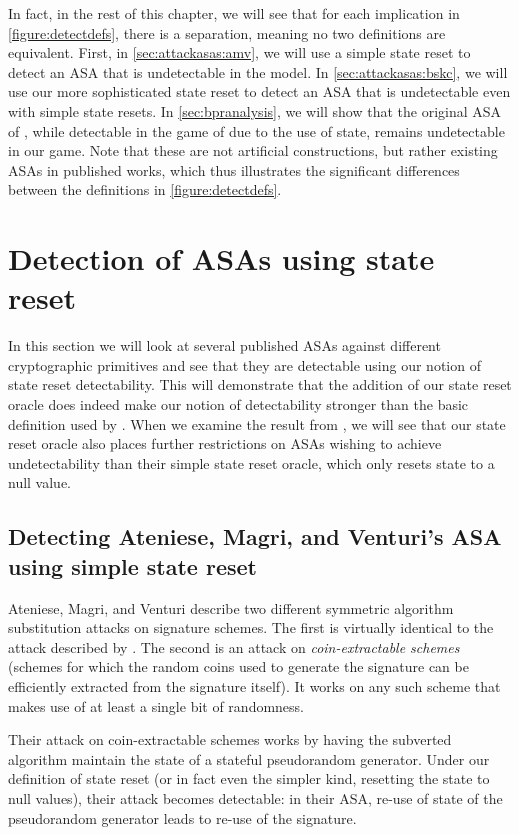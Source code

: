 In fact, in the rest of this chapter, we will see that for each implication in  \autoref{figure:detectdefs}, there is a separation, meaning no two definitions are equivalent. First, in \autoref{sec:attackasas:amv}, we will use a simple state reset to detect an ASA that is undetectable in the \cite{C:BelPatRog14} model. In \autoref{sec:attackasas:bskc}, we will use our more sophisticated state reset to detect an ASA that is undetectable even with simple state resets. In \autoref{sec:bpranalysis}, we will show that the original ASA of \cite{C:BelPatRog14}, while detectable in the game of \cite{CCS:BelJaeKan15} due to the use of state, remains undetectable in our game. Note that these are not artificial constructions, but rather existing ASAs in published works, which thus illustrates the significant differences between the definitions in \autoref{figure:detectdefs}.


\section{Detection of ASAs using state reset} \label{sec:attackasas}
In this section we will look at several published ASAs against different cryptographic primitives and see that they are detectable using our notion of state reset detectability. This will demonstrate that the addition of our state reset oracle does indeed make our notion of detectability stronger than the basic definition used by \cite{C:BelPatRog14}. When we examine the result from \cite{BSKC2019}, we will see that our state reset oracle also places further restrictions on ASAs wishing to achieve undetectability than their simple state reset oracle, which only resets state to a null value.


\subsection{Detecting Ateniese, Magri, and Venturi's ASA using simple state reset} \label{sec:attackasas:amv}
Ateniese, Magri, and Venturi \cite{CCS:AteMagVen15} describe two different symmetric algorithm substitution attacks on signature schemes. The first is virtually identical to the attack described by \cite{CCS:BelJaeKan15}. The second is an attack on \emph{coin-extractable schemes} (schemes for which the random coins used to generate the signature can be efficiently extracted from the signature itself). It works on any such scheme that makes use of at least a single bit of randomness.

Their attack on coin-extractable schemes works by having the subverted algorithm maintain the state of a stateful pseudorandom generator. Under our definition of state reset (or in fact even the simpler kind, resetting the state to null values), their attack becomes detectable: in their ASA, re-use of state of the pseudorandom generator leads to re-use of the signature.

